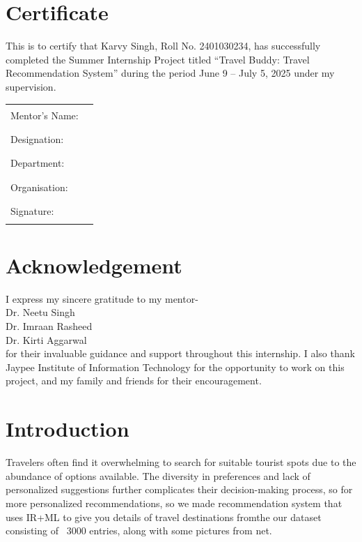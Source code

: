 \documentclass[12pt,a4paper]{report}
\begin{document}
\section*{Certificate}

This is to certify that Karvy Singh, Roll No. 2401030234, has successfully completed the Summer Internship Project titled “Travel Buddy: Travel Recommendation System” during the period June 9 – July 5, 2025 under my supervision.

\vspace{2cm}
\noindent
\begin{tabular}{@{}l@{\quad}l}
  Mentor’s Name:   & \rule{4cm}{0.4pt}\\
  Designation:     & \rule{4cm}{0.4pt} \\
  Department:      & \rule{4cm}{0.4pt} \\
  Organisation:    & \rule{4cm}{0.4pt} \\
  Signature:       & \rule{4cm}{0.4pt}
\end{tabular}

\newpage
\thispagestyle{empty}
\section*{Acknowledgement}

I express my sincere gratitude to my mentor-\\ 
Dr. Neetu Singh\\	
Dr. Imraan Rasheed  \\
Dr. Kirti Aggarwal  \\
for their invaluable guidance and support throughout this internship. I also thank Jaypee Institute of Information Technology for the opportunity to work on this project, and my family and friends for their encouragement.

\newpage
\tableofcontents
\newpage

\newpage
\section{Introduction}
Travelers often find it overwhelming to search for suitable tourist spots due to the abundance of options available. The diversity in preferences and lack of personalized suggestions further complicates their decision-making process, so for more personalized recommendations, so we made recommendation system that uses IR+ML to give you details of travel destinations fromthe our dataset consisting of ~3000 entries, along with some pictures from net.
\end{document}
